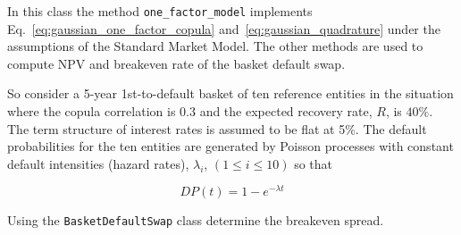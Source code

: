 In this class the method \texttt{one\_factor\_model} implements Eq.~\ref{eq:gaussian_one_factor_copula} and~\ref{eq:gaussian_quadrature} under the assumptions of the Standard Market Model.
The other methods are used to compute NPV and breakeven rate of the basket default swap.

So consider a 5-year 1st-to-default basket of ten
reference entities in the situation where the copula correlation is 0.3
and the expected recovery rate, \(R\), is \(40\%\). The term structure
of interest rates is assumed to be flat at 5\%. The default
probabilities for the ten entities are generated by Poisson processes
with constant default intensities (hazard rates), \(\lambda_i\),
\((1 \le i \le 10)\) so that

\[ DP(t) = 1 - e^{-\lambda t} \]

Using the \texttt{BasketDefaultSwap} class determine the breakeven spread.

